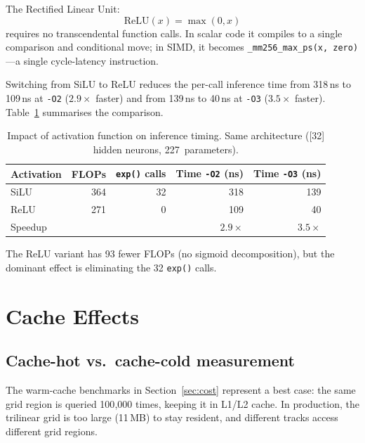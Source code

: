 \documentclass[11pt,a4paper]{article}
\begin{document}
The Rectified Linear Unit:
\begin{equation}
    \text{ReLU}(x) = \max(0, x)
    \label{eq:relu}
\end{equation}
requires no transcendental function calls.  In scalar code it compiles
to a single comparison and conditional move; in SIMD, it becomes
\texttt{\_mm256\_max\_ps(x, zero)}---a single cycle-latency
instruction.

Switching from SiLU to ReLU reduces the per-call inference time from
318\,ns to 109\,ns at \texttt{-O2} ($2.9\times$ faster) and from
139\,ns to 40\,ns at \texttt{-O3} ($3.5\times$ faster).
Table~\ref{tab:activation} summarises the comparison.

\begin{table}[htbp]
\centering
\caption{Impact of activation function on inference timing.  Same
architecture ([32] hidden neurons, 227~parameters).}
\label{tab:activation}
\begin{tabular}{lrrrr}
\toprule
Activation & FLOPs & \texttt{exp()} calls & Time \texttt{-O2} (ns) &
Time \texttt{-O3} (ns) \\
\midrule
SiLU & 364 & 32 & 318 & 139 \\
ReLU & 271 & 0 & 109 & 40 \\
\midrule
Speedup & & & $2.9\times$ & $3.5\times$ \\
\bottomrule
\end{tabular}
\end{table}

The ReLU variant has 93 fewer FLOPs (no sigmoid decomposition), but
the dominant effect is eliminating the 32 \texttt{exp()} calls.


\section{Cache Effects}
\label{sec:cache}

\subsection{Cache-hot vs.\ cache-cold measurement}
\label{sec:cache_method}

The warm-cache benchmarks in Section~\ref{sec:cost} represent a best
case: the same grid region is queried 100{,}000 times, keeping it in
L1/L2 cache.  In production, the trilinear grid is too large (11\,MB)
to stay resident, and different tracks access different grid regions.
\end{document}
